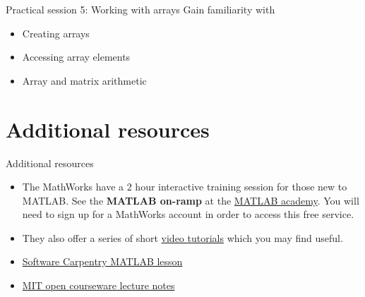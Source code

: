 \documentclass{beamer}
\begin{document}
\begin{frame}{Practical session 5: Working with arrays}
	Gain familiarity with \begin{itemize}
		\item Creating arrays
		\item Accessing array elements
		\item Array and matrix arithmetic
	\end{itemize}
\end{frame}

\section{Additional resources}
\begin{frame}{Additional resources}
	\begin{itemize}
		\item The MathWorks have a 2 hour interactive training session for those new to MATLAB. See the \textbf{MATLAB on-ramp} at the \href{https://matlabacademy.mathworks.com/}{MATLAB academy}. You will need to sign up for a MathWorks account in order to access this free service.
		\item They also offer a series of short \href{http://uk.mathworks.com/videos/index.html}{video tutorials} which you may find useful.
		\item \href{http://swcarpentry.github.io/matlab-novice-inflammation/}{Software Carpentry MATLAB lesson}
		\item \href{http://ocw.mit.edu/courses/electrical-engineering-and-computer-science/6-094-introduction-to-matlab-january-iap-2010/lecture-notes/}{MIT open courseware lecture notes}
	\end{itemize}
	
	
\end{frame}
\end{document}
